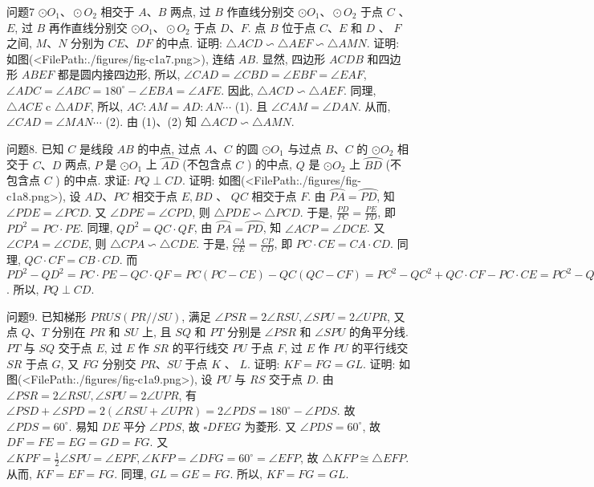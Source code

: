 问题7 $\odot O_1 、 \odot O_2$ 相交于 $A 、 B$ 两点, 过 $B$ 作直线分别交 $\odot O_1 、 \odot O_2$ 于点 $C$ 、 $E$, 过 $B$ 再作直线分别交 $\odot O_1 、 \odot O_2$ 于点 $D 、 F$. 点 $B$ 位于点 $C 、 E$ 和 $D$ 、 $F$ 之间, $M 、 N$ 分别为 $C E 、 D F$ 的中点.
证明: $\triangle A C D \backsim \triangle A E F \backsim \triangle A M N$.
证明: 如图(<FilePath:./figures/fig-c1a7.png>), 连结 $A B$. 显然, 四边形 $A C D B$ 和四边形 $A B E F$ 都是圆内接四边形, 所以, $\angle C A D=\angle C B D=\angle E B F=\angle E A F$, $\angle A D C=\angle A B C=180^{\circ}-\angle E B A=\angle A F E$. 因此, $\triangle A C D \backsim \triangle A E F$. 同理, $\triangle A C E$ c $\triangle A D F$, 所以, $A C: A M=A D: A N \cdots$ (1). 且 $\angle C A M=\angle D A N$. 从而, $\angle C A D=\angle M A N \cdots$ (2).
由 (1)、(2) 知 $\triangle A C D \backsim \triangle A M N$.



问题8. 已知 $C$ 是线段 $A B$ 的中点, 过点 $A 、 C$ 的圆 $\odot O_1$ 与过点 $B 、 C$ 的 $\odot O_2$ 相交于 $C 、 D$ 两点, $P$ 是 $\odot O_1$ 上 $\overparen{A D}$ (不包含点 $C$ ) 的中点, $Q$ 是 $\odot O_2$ 上 $\overparen{B D}$ (不包含点 $C$ ) 的中点.
求证: $P Q \perp C D$.
证明: 如图(<FilePath:./figures/fig-c1a8.png>), 设 $A D 、 P C$ 相交于点 $E, B D$ 、 $Q C$ 相交于点 $F$. 由 $\overparen{P A}=\overparen{P D}$, 知 $\angle P D E= \angle P C D$. 又 $\angle D P E=\angle C P D$, 则 $\triangle P D E \backsim \triangle P C D$. 于是, $\frac{P D}{P C}=\frac{P E}{P D}$, 即 $P D^2=P C \cdot P E$. 同理, $Q D^2=Q C \cdot Q F$, 由 $\overparen{P A}=\overparen{P D}$, 知 $\angle A C P= \angle D C E$. 又 $\angle C P A=\angle C D E$, 则 $\triangle C P A \backsim\triangle C D E$. 于是, $\frac{C A}{C E}=\frac{C P}{C D}$, 即 $P C \cdot C E=C A \cdot C D$. 同理, $Q C \cdot C F=C B \cdot C D$. 而 $P D^2-Q D^2=P C \cdot P E-Q C \cdot Q F=P C(P C-C E)-Q C(Q C-C F)= P C^2-Q C^2+Q C \cdot C F-P C \cdot C E=P C^2-Q C^2+C B \cdot C D-C A \cdot C D= P C^2-Q C^2$. 所以, $P Q \perp C D$.



问题9. 已知梯形 $P R U S(P R / / S U)$, 满足 $\angle P S R=2 \angle R S U, \angle S P U= 2 \angle U P R$, 又点 $Q 、 T$ 分别在 $P R$ 和 $S U$ 上, 且 $S Q$ 和 $P T$ 分别是 $\angle P S R$ 和 $\angle S P U$ 的角平分线.
$P T$ 与 $S Q$ 交于点 $E$, 过 $E$ 作 $S R$ 的平行线交 $P U$ 于点 $F$, 过 $E$ 作 $P U$ 的平行线交 $S R$ 于点 $G$, 又 $F G$ 分别交 $P R 、 S U$ 于点 $K$ 、
$L$. 证明: $K F=F G=G L$.
证明: 如图(<FilePath:./figures/fig-c1a9.png>), 设 $P U$ 与 $R S$ 交于点 $D$. 由 $\angle P S R=2 \angle R S U, \angle S P U=2 \angle U P R$, 有 $\angle P S D+\angle S P D=2(\angle R S U+\angle U P R)= 2 \angle P D S=180^{\circ}-\angle P D S$. 故 $\angle P D S=60^{\circ}$. 易知 $D E$ 平分 $\angle P D S$, 故 $\square D F E G$ 为菱形.
又
$\angle P D S=60^{\circ}$, 故 $D F=F E=E G=G D=F G$. 又 $\angle K P F=\frac{1}{2} \angle S P U= \angle E P F, \angle K F P=\angle D F G=60^{\circ}=\angle E F P$, 故 $\triangle K F P \cong \triangle E F P$. 从而, $K F=E F=F G$. 同理, $G L=G E=F G$. 所以, $K F=F G=G L$.



